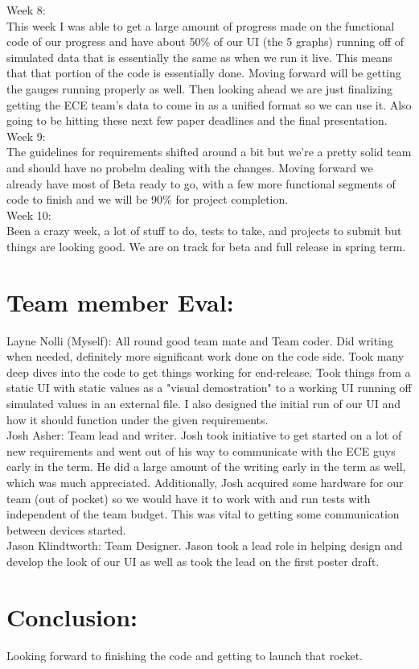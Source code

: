 \documentclass{article}
\begin{document}
Week 8:\\
This week I was able to get a large amount of progress made on the functional code of our progress and have about 50\% of our UI (the 5 graphs) running off of simulated data that is essentially the same as when we run it live. This means that that portion of the code is essentially done. Moving forward will be getting the gauges running properly as well. Then looking ahead we are just finalizing getting the ECE team's data to come in as a unified format so we can use it. Also going to be hitting these next few paper deadlines and the final presentation.\\

Week 9:\\
The guidelines for requirements shifted around a bit but we're a pretty solid team and should have no probelm dealing with the changes. Moving forward we already have most of Beta ready to go, with a few more functional segments of code to finish and we will be 90\% for project completion.\\

Week 10:\\
Been a crazy week, a lot of stuff to do, tests to take, and projects to submit but things are looking good. We are on track for beta and full release in spring term.\\

\section{Team member Eval:}

Layne Nolli (Myself): All round good team mate and Team coder. Did writing when needed, definitely more significant work done on the code side. Took many deep dives into the code to get things working for end-release. Took things from a static UI with static values as a "visual demostration" to a working UI running off simulated values in an external file. I also designed the initial run of our UI and how it should function under the given requirements.\\

Josh Asher: Team lead and writer. Josh took initiative to get started on a lot of new requirements and went out of his way to communicate with the ECE guys early in the term. He did a large amount of the writing early in the term as well, which was much appreciated. Additionally, Josh acquired some hardware for our team (out of pocket) so we would have it to work with and run tests with independent of the team budget. This was vital to getting some communication between devices started.\\

Jason Klindtworth: Team Designer. Jason took a lead role in helping design and develop the look of our UI as well as took the lead on the first poster draft.\\


\section{Conclusion:}

Looking forward to finishing the code and getting to launch that rocket.\\
\end{document}
